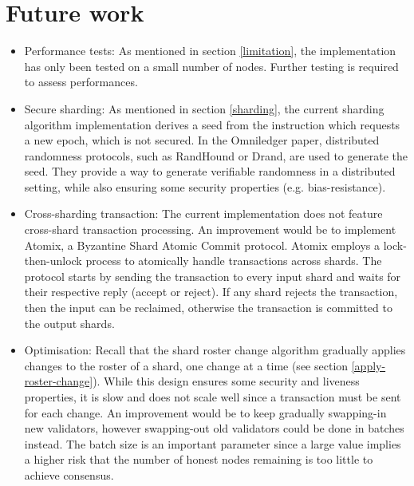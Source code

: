 \section{Future work}
\begin{itemize}
	
	\label{secure-sharding}
	\item Performance tests: As mentioned in section \ref{limitation}, the implementation has only been tested on a small number of nodes. Further testing is required to assess performances.
	
	\item Secure sharding: As mentioned in section \ref{sharding}, the current sharding algorithm implementation derives a seed from the instruction which requests a new epoch, which is not secured. In the Omniledger paper, distributed randomness protocols, such as RandHound\cite{cryptoeprint:2016:1067} or Drand\cite{drand}, are used to generate the seed. They provide a way to generate verifiable randomness in a distributed setting, while also ensuring some security properties (e.g. bias-resistance).
	
	\item Cross-sharding transaction: The current implementation does not feature cross-shard transaction processing. An improvement would be to implement Atomix\cite{kokoris-kogias_omniledger:_2018}, a Byzantine Shard Atomic Commit protocol. Atomix employs a lock-then-unlock process to atomically handle transactions across shards. The protocol starts by sending the transaction to every input shard and waits for their respective reply (accept or reject). If any shard rejects the transaction, then the input can be reclaimed, otherwise the transaction is committed to the output shards. 
	
	\item Optimisation: Recall that the shard roster change algorithm gradually applies changes to the roster of a shard, one change at a time (see section \ref{apply-roster-change}). While this design ensures some security and liveness properties, it is slow and does not scale well since  a transaction must be sent for each change. An improvement would be to keep gradually swapping-in new validators, however swapping-out old validators could be done in batches instead. The batch size is an important parameter since a large value implies a higher risk that the number of honest nodes remaining is too little to achieve consensus.
	

\end{itemize}
